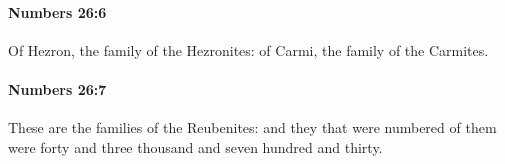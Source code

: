 		\paragraph{Numbers 26:6} %
			\label{NUMBERS-26-6}

			Of Hezron, the family of the Hezronites: of Carmi, the family of the Carmites.


		\paragraph{Numbers 26:7} %
			\label{NUMBERS-26-7}

			These are the families of the Reubenites: and they that were numbered of them were forty and three thousand and seven hundred and thirty.


